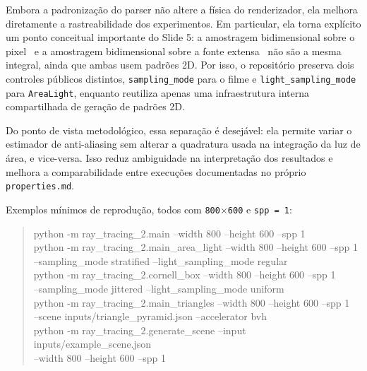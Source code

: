 \documentclass[portuguese]{sbcreviews-2025}%
\newcommand{\slidescite}[2]{\citep[pp.~#2]{#1}}
\begin{document}
Embora a padronização do parser não altere a física do renderizador, ela melhora diretamente a rastreabilidade dos experimentos. Em particular, ela torna explícito um ponto conceitual importante do Slide 5: a amostragem bidimensional sobre o pixel~\slidescite{inf2608slides05}{4--9} e a amostragem bidimensional sobre a fonte extensa~\slidescite{inf2608slides05}{14--23} não são a mesma integral, ainda que ambas usem padrões 2D. Por isso, o repositório preserva dois controles públicos distintos, \texttt{sampling\_mode} para o filme e \texttt{light\_sampling\_mode} para \texttt{AreaLight}, enquanto reutiliza apenas uma infraestrutura interna compartilhada de geração de padrões 2D.

Do ponto de vista metodológico, essa separação é desejável: ela permite variar o estimador de anti-aliasing sem alterar a quadratura usada na integração da luz de área, e vice-versa. Isso reduz ambiguidade na interpretação dos resultados e melhora a comparabilidade entre execuções documentadas no próprio \texttt{properties.md}.

Exemplos mínimos de reprodução, todos com \texttt{800$\times$600} e \texttt{spp = 1}:

\begin{quote}
\small\ttfamily
python -m ray\_tracing\_2.main --width 800 --height 600 --spp 1\\
python -m ray\_tracing\_2.main\_area\_light --width 800 --height 600 --spp 1\\
\hspace*{1em}--sampling\_mode stratified --light\_sampling\_mode regular\\
python -m ray\_tracing\_2.cornell\_box --width 800 --height 600 --spp 1\\
\hspace*{1em}--sampling\_mode jittered --light\_sampling\_mode uniform\\
python -m ray\_tracing\_2.main\_triangles --width 800 --height 600 --spp 1\\
\hspace*{1em}--scene inputs/triangle\_pyramid.json --accelerator bvh\\
python -m ray\_tracing\_2.generate\_scene --input inputs/example\_scene.json\\
\hspace*{1em}--width 800 --height 600 --spp 1
\end{quote}
\end{document}
